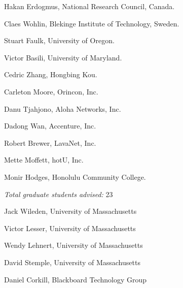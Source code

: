 \begin{Collaborators}
\item Hakan Erdogmus, National Research Council, Canada.
\item Claes Wohlin, Blekinge Institute of Technology, Sweden.
\item Stuart Faulk, University of Oregon.
\item Victor Basili, University of Maryland.
\end{Collaborators}


\begin{Thesis Advisor and Postgraduate-Scholar Sponsor}
\item Cedric Zhang, Hongbing Kou.
\item Carleton Moore, Orincon, Inc.
\item Danu Tjahjono, Aloha Networks, Inc.
\item Dadong Wan, Accenture, Inc.
\item Robert Brewer, LavaNet, Inc.
\item Mette Moffett, hotU, Inc.
\item Monir Hodges, Honolulu Community College.

\item {\em Total graduate students advised:} 23

\end{Thesis Advisor and Postgraduate-Scholar Sponsor}

\begin{Graduate and Postdoctoral Advisors}
\item Jack Wileden, University of Massachusetts
\item Victor Lesser, University of Massachusetts
\item Wendy Lehnert, University of Massachusetts
\item David Stemple, University of Massachusetts
\item Daniel Corkill, Blackboard Technology Group
\end{Graduate and Postdoctoral Advisors}












